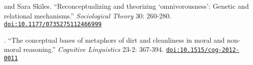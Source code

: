 
 and Sara Skiles. ``Reconceptualizing and theorizing ‘omnivorousness’: Genetic and relational mechanisms.'' {\em Sociological Theory} 30: 260-280. \href{https://doi.org/10.1177/0735275112466999}{\nolinkurl{doi:10.1177/0735275112466999}}

.  ``The conceptual bases of metaphors of dirt and cleanliness in moral and non-moral reasoning.'' {\em Cognitive Linguistics} 23-2: 367-394. \href{https://doi.org/10.1515/cog-2012-0011}{\nolinkurl{doi:10.1515/cog-2012-0011}}
